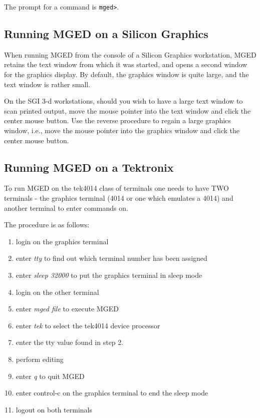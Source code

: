 The prompt for a command is {\tt mged>}.

\subsection{Running MGED on a Silicon Graphics}

When running MGED from the console of a Silicon Graphics workstation,
MGED retains the text window from which it was started,
and opens a second window for the graphics display.
By default, the graphics window is quite large, and the text window
is rather small.

On the SGI 3-d workstations,
should you wish to have a large text window to scan printed output, move
the mouse pointer into the text window and click the center mouse button.
Use the reverse procedure to regain a large graphics window, i.e.,
move the mouse pointer into the graphics window
and click the center mouse button.

\subsection{Running MGED on a Tektronix}

To run MGED on the tek4014 class of terminals one needs to have TWO
terminals - the graphics terminal (4014 or one which emulates a 4014) and
another terminal to enter commands on.

The procedure is as follows:
\begin{enumerate}
\item login on the graphics terminal
\item enter {\em tty} to find out which terminal number has been assigned
\item  enter {\em sleep 32000} to put the graphics terminal in sleep mode
\item  login on the other terminal
\item  enter {\em mged file} to execute MGED
\item  enter {\em tek} to select the tek4014 device processor
\item  enter the tty value found in step 2.
\item  perform editing
\item  enter {\em q} to quit MGED
\item  enter control-c on the graphics terminal to end the sleep mode
\item  logout on both terminals
\end{enumerate}

